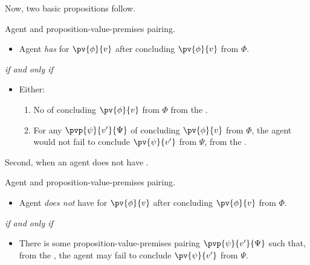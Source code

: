 \begin{note}
  Now, two basic propositions follow.

  \begin{proposition}
    Agent and proposition-value-premises pairing.

    \begin{itemize}
    \item
      Agent \emph{has} \zS{} for \(\pv{\phi}{v}\) after concluding \(\pv{\phi}{v}\) from \(\Phi\).
    \end{itemize}

    \emph{if and only if}

    \begin{itemize}
    \item
      Either:
      \begin{enumerate}[label=(\alph*), ref=\alph*]
      \item
        No  of concluding \(\pv{\phi}{v}\) from \(\Phi\) from the \agpe{}.
      \item
        For any \requ{} \(\pvp{\psi}{v'}{\Psi}\) of concluding \(\pv{\phi}{v}\) from \(\Phi\), the agent would not fail to conclude \(\pv{\psi}{v'}\) from \(\Psi\), from the \agpe{}.
      \end{enumerate}
    \end{itemize}
  \end{proposition}

  Second, when an agent does not have \zS{}.

  \begin{proposition}
    Agent and proposition-value-premises pairing.
    \begin{itemize}
    \item
      Agent \emph{does not} have \zS{} for \(\pv{\phi}{v}\) after concluding \(\pv{\phi}{v}\) from \(\Phi\).
    \end{itemize}

    \emph{if and only if}

    \begin{itemize}
    \item
      There is some proposition-value-premises pairing \(\pvp{\psi}{v'}{\Psi}\) such that, from the \agpe{}, the agent may fail to conclude \(\pv{\psi}{v'}\) from \(\Psi\).
    \end{itemize}
  \end{proposition}
\end{note}

